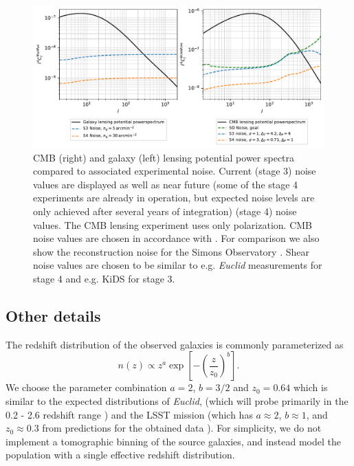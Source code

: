 \documentclass[11pt]{article} %
\newcommand{\br}[1]{\ensuremath{\left( #1 \right)}}
\newcommand{\sbr}[1]{\ensuremath{\left[ #1 \right]}}
\begin{document}
\begin{figure}[t]
    \centering
    \includegraphics[width=\textwidth]{../code/plots/spectraplusnoise.pdf}
    \caption{ CMB (right) and galaxy (left) lensing potential power spectra compared to associated experimental noise. Current (stage 3) noise values are displayed as well as near future (some of the stage 4 experiments are already in operation, but expected noise levels are only achieved after several years of integration) (stage 4) noise values. The CMB lensing experiment uses only polarization. CMB noise values are chosen in accordance with \cite{Namikawa_2016}. For comparison we also show the reconstruction noise for the Simons Observatory \cite{Ade2019}. Shear noise values are chosen to be similar to e.g. \textit{Euclid} measurements \cite{laureijs2009} for stage 4 and e.g. KiDS \cite{kuijken2021} for stage 3.}
    \label{fig:lpsplusnoise}
\end{figure}

\subsection{Other details}
The redshift distribution of the observed galaxies is commonly parameterized as \cite{Bartelmann2001}
\begin{equation*}
    n(z) \propto z^a \exp\sbr{-\br{\frac{z}{z_0}}^b}.
\end{equation*}
We choose the parameter combination $a = 2$, $b = 3/2$ and $z_0 = 0.64$ which is similar to the expected distributions of \textit{Euclid}, (which will probe primarily in the 0.2 - 2.6 redshift range \cite{euclidprep10})
and the LSST mission (which has $a \approx 2$, $b \approx 1$, and $z_0 \approx 0.3$ from predictions for the obtained data \cite{lsstsciencebookchapter3}). For simplicity, we do not implement a tomographic binning of the source galaxies, and instead model the population with a single effective redshift distribution.
\end{document}
